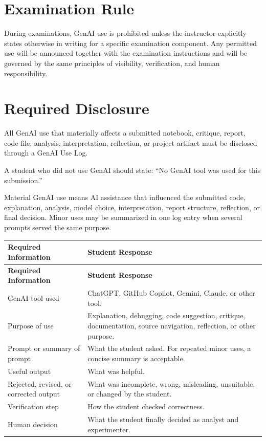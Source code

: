\documentclass[11pt]{article}
\begin{document}
\section{Examination Rule}

During examinations, GenAI use is prohibited unless the instructor explicitly states otherwise in writing for a specific examination component. Any permitted use will be announced together with the examination instructions and will be governed by the same principles of visibility, verification, and human responsibility.

\section{Required Disclosure}

All GenAI use that materially affects a submitted notebook, critique, report, code file, analysis, interpretation, reflection, or project artifact must be disclosed through a GenAI Use Log.

A student who did not use GenAI should state: ``No GenAI tool was used for this submission.''

Material GenAI use means AI assistance that influenced the submitted code, explanation, analysis, model choice, interpretation, report structure, reflection, or final decision. Minor uses may be summarized in one log entry when several prompts served the same purpose.

\begin{longtable}{p{}p{}}
\toprule
\textbf{Required Information} & \textbf{Student Response} \\
\midrule
\endfirsthead
\toprule
\textbf{Required Information} & \textbf{Student Response} \\
\midrule
\endhead
\bottomrule
\endfoot
GenAI tool used & ChatGPT, GitHub Copilot, Gemini, Claude, or other tool. \\
Purpose of use & Explanation, debugging, code suggestion, critique, documentation, source navigation, reflection, or other purpose. \\
Prompt or summary of prompt & What the student asked. For repeated minor uses, a concise summary is acceptable. \\
Useful output & What was helpful. \\
Rejected, revised, or corrected output & What was incomplete, wrong, misleading, unsuitable, or changed by the student. \\
Verification step & How the student checked correctness. \\
Human decision & What the student finally decided as analyst and experimenter. \\
\end{longtable}
\end{document}
